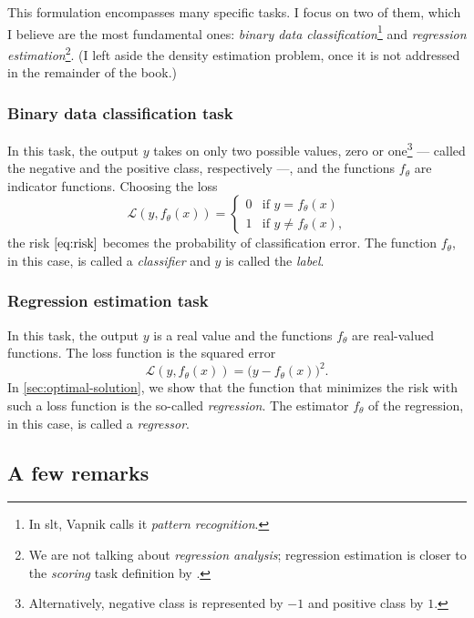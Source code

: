This formulation encompasses many specific tasks. I focus on two of them, which I
believe are the most fundamental ones: \emph{binary data classification}\footnote{In
\gls{slt}, Vapnik calls it \emph{pattern recognition}.} and \emph{regression
estimation}\footnote{We are not talking about \emph{regression analysis}; regression
estimation is closer to the \emph{scoring} task definition by .}.  (I
left aside the density estimation problem, once it is not addressed in the remainder of
the book.)

\subsubsection{Binary data classification task}

In this task, the output $y$ takes on
only two possible values, zero or one\footnote{Alternatively, negative class is
represented by $-1$ and positive class by $1$.} --- called the negative and the positive
class, respectively ---, and the functions $f_\theta$ are indicator
functions. Choosing the loss
\begin{equation*}
  \mathcal{L}(y, f_\theta(x)) = \begin{cases}
    0 & \text{if } y = f_\theta(x) \\
    1 & \text{if } y \neq f_\theta(x)\text{,}
  \end{cases}
\end{equation*}
the risk $\eqref{eq:risk}$ becomes the probability of
classification error.  The function $f_\theta$, in this case, is called a \emph{classifier}
and $y$ is called the \emph{label}.

\subsubsection{Regression estimation task}

In this task, the output $y$ is a real value and the functions $f_\theta$ are real-valued
functions.  The loss function is the squared error
\[
  \mathcal{L}(y, f_\theta(x)) = \big(y - f_\theta(x)\big)^2\text{.}
\]
In \cref{sec:optimal-solution}, we show that the function that minimizes the risk with such
a loss function is the so-called \emph{regression}.
The estimator $f_\theta$ of the regression, in this case, is called a \emph{regressor}.

\subsection{A few remarks}


